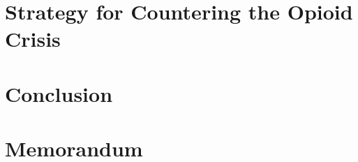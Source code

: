 \documentclass[12pt]{article} %
\begin{document}
\section{Strategy for Countering the Opioid Crisis}


\section{Conclusion}


\newpage
\section{Memorandum}


\newpage
\end{document}
